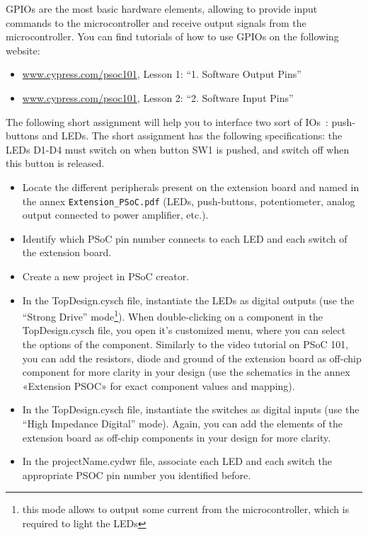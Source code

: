 GPIOs are the most basic hardware elements, allowing to provide input commands to the microcontroller and receive output signals from the microcontroller. You can find tutorials of how to use GPIOs on the following website: 
\begin{itemize}
	\item \url{www.cypress.com/psoc101}, Lesson 1: ``1. Software Output Pins''
	\item \url{www.cypress.com/psoc101}, Lesson 2: ``2. Software Input Pins''
\end{itemize}
The following short assignment will help you to interface two sort of IOs~: push-buttons and LEDs. The short assignment has the following specifications: the LEDs D1-D4 must switch on when button SW1 is pushed, and switch off when this button is released. 
\begin{itemize}
	\item Locate the different peripherals present on the extension board and named in the annex \texttt{Extension\_PSoC.pdf} (LEDs, push-buttons, potentiometer, analog output connected to power amplifier, etc.). 
	\item Identify which PSoC pin number connects to each LED and each switch of the extension board. 
	\item Create a new project in PSoC creator. 
	\item In the TopDesign.cysch file, instantiate the LEDs as digital outputs (use the ``Strong Drive'' mode\footnote{this mode allows to output some current from the microcontroller, which is required to light the LEDs}). When double-clicking on a component in the TopDesign.cysch file, you open it's customized menu, where you can select the options of the component. Similarly to the video tutorial on PSoC 101, you can add the resistors, diode and ground of the extension board as off-chip component for more clarity in your design (use the schematics in the annex «Extension PSOC» for exact component values and mapping). 
	\item In the TopDesign.cysch file, instantiate the switches as digital inputs (use the ``High Impedance Digital'' mode). Again, you can add the elements of the extension board as off-chip components in your design for more clarity. 
	\item In the projectName.cydwr file, associate each LED and each switch the appropriate PSOC pin number you identified before. 
	

\end{itemize}
